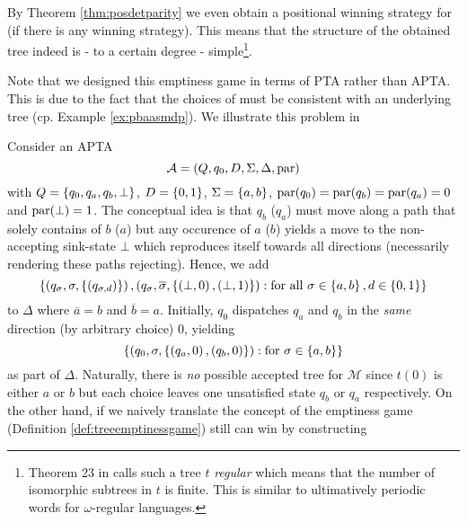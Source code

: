 By Theorem \ref{thm:posdetparity} we even obtain a positional winning strategy 
for \eve{} (if there is any winning strategy). This means that the structure of 
the obtained tree indeed is - to a certain degree - simple\footnote{
  Theorem 23 in \cite{ParityGamesPosDet} calls such a tree $t$ \emph{regular} 
  which means that the number of isomorphic subtrees in $t$ is finite. This
  is similar to ultimatively periodic words for $\omega$-regular languages.
}.

Note that we designed this emptiness game in terms of \ac{PTA} rather than 
\ac{APTA}. This is due to the fact that the choices of \eve{} must be 
consistent with an underlying tree (cp. Example \ref{ex:pbaasmdp}). We 
illustrate this problem in
\begin{example}
  Consider an \ac{APTA}
  \begin{equation*}
    \mathcal{A} = \left(Q, q_{0}, D, \Sigma, \Delta, \operatorname{par}\right)
  \end{equation*}
  with $Q = \left\{q_{0}, q_{a}, q_{b}, \bot\right\}$, $D = \left\{0,1\right\}$, 
  $\Sigma = \left\{a, b\right\}$, $\operatorname{par}(q_{0}) = \operatorname{par}(q_{b}) = \operatorname{par}(q_{a}) 
    = 0$ and $\operatorname{par}(\bot) = 1$. The conceptual idea is that $q_{b}$ ($q_{a}$) 
  must move along a path that solely contains of $b$ ($a$) but any occurence of 
  $a$ ($b$) yields a move to the non-accepting sink-state $\bot$ which 
  reproduces itself towards all directions (necessarily rendering these paths
  rejecting). Hence, we add 
  \begin{equation*}
    \left\{
      \left(q_{\sigma}, \sigma, \left\{\left(q_{\sigma, d}\right)\right\}\right),
      \left(q_{\sigma}, \overline{\sigma}, \left\{\left(\bot, 0\right), 
        \left(\bot, 1\right)\right\}\right):\text{for all }\sigma\in\left\{a,b\right\}, d\in\left\{0,1\right\}
    \right\}
  \end{equation*}
  to $\Delta$ where $\overline{a} = b$ and $\overline{b} = a$. Initially, 
  $q_{0}$ dispatches $q_{a}$ and $q_{b}$ in the \emph{same} direction (by 
  arbitrary choice) $0$, yielding
  \begin{equation*}
    \left\{
      \left(q_{0}, \sigma, \left\{\left(q_{a}, 0\right), \left(q_{b}, 0\right)\right\}\right):
        \text{for }\sigma\in\left\{a, b\right\}
      \right\}
  \end{equation*}
  as part of $\Delta$. Naturally, there is \emph{no} possible accepted tree for 
  $\mathcal{M}$ since $t(0)$ is either $a$ or $b$ but each choice leaves one
  unsatisfied state $q_{b}$ or $q_{a}$ respectively. On the other hand, if we
  naively translate the concept of the emptiness game (Definition 
  \ref{def:treeemptinessgame}) \eve{} still can win by constructing 

\end{example}
